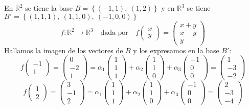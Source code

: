 
En \(\mathbb{R}^2\) se tiene la base \(B = \left\{(-1,1),~(1,2)\right\}\) y en \(\mathbb{R}^3\) se tiene \(B'=\left\{(1,1,1),~(1,1,0),~(-1,0,0)\right\}\)
\[
f:\mathbb{R}^2 \rightarrow \mathbb{R}^3 \quad \text{dada por}\quad f\begin{pmatrix}
  x \\ y
\end{pmatrix} = \begin{pmatrix}
  x+y \\ x-y \\ y
\end{pmatrix}
\]
Hallamos la imagen de los vectores de \(B\) y los expresamos en la base \(B'\):
\[
f\begin{pmatrix}
  -1 \\ 1
\end{pmatrix} = \begin{pmatrix}
  0 \\ -2 \\ 1
\end{pmatrix} = \alpha_1 \begin{pmatrix}
  1 \\ 1 \\ 1
\end{pmatrix} + \alpha_2 \begin{pmatrix}
  1 \\ 1 \\ 0
\end{pmatrix} + \alpha_3 \begin{pmatrix}
  -1 \\ 0 \\ 0
\end{pmatrix} = \begin{pmatrix}
  1 \\ -3 \\ -2
\end{pmatrix}
\]
\[
f\begin{pmatrix}
  1 \\ 2
\end{pmatrix} = \begin{pmatrix}
  3 \\ -1 \\ 2
\end{pmatrix} = \alpha_1 \begin{pmatrix}
  1 \\ 1 \\ 1
\end{pmatrix} + \alpha_2 \begin{pmatrix}
  1 \\ 1 \\ 0
\end{pmatrix} + \alpha_3 \begin{pmatrix}
  -1 \\ 0 \\ 0
\end{pmatrix} = \begin{pmatrix}
  2 \\ -3 \\ -4
\end{pmatrix}
\]

